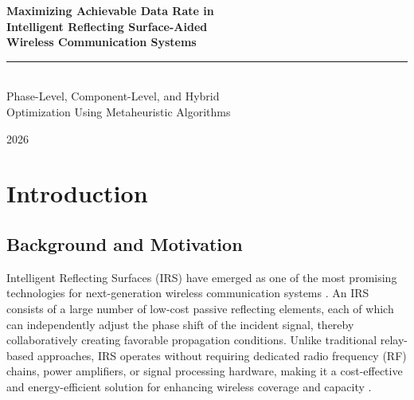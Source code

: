 \documentclass[12pt,a4paper]{article}
\begin{document}
\begin{titlepage}
\centering
\vspace*{4cm}

{\LARGE \textbf{Maximizing Achievable Data Rate in}}\\[0.4cm]
{\LARGE \textbf{Intelligent Reflecting Surface-Aided}}\\[0.4cm]
{\LARGE \textbf{Wireless Communication Systems}}\\[1.2cm]

\rule{0.6\textwidth}{0.8pt}\\[1.2cm]

{\large Phase-Level, Component-Level, and Hybrid\\[0.2cm]
Optimization Using Metaheuristic Algorithms}\\[2cm]

\vfill

{\large 2026}
\end{titlepage}

\newpage
\tableofcontents
\newpage
\listoffigures
\listoftables
\newpage

\section{Introduction}
\label{sec:introduction}

\subsection{Background and Motivation}

Intelligent Reflecting Surfaces (IRS) have emerged as one of the most promising technologies for next-generation wireless communication systems \cite{wu2020towards, huang2019reconfigurable}. An IRS consists of a large number of low-cost passive reflecting elements, each of which can independently adjust the phase shift of the incident signal, thereby collaboratively creating favorable propagation conditions. Unlike traditional relay-based approaches, IRS operates without requiring dedicated radio frequency (RF) chains, power amplifiers, or signal processing hardware, making it a cost-effective and energy-efficient solution for enhancing wireless coverage and capacity \cite{wu2019intelligent}.
\end{document}
